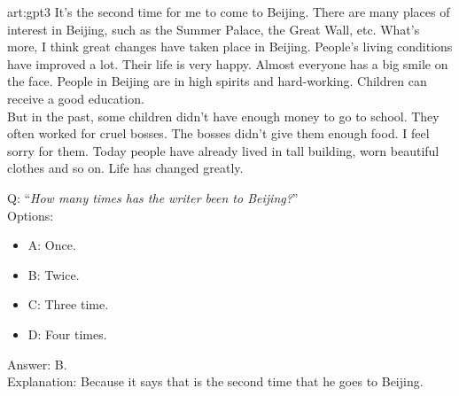 \begin{passage}{art:gpt3}
 It's the second time for me to come to Beijing. There are many places of interest in Beijing, such as the Summer Palace, the Great Wall, etc. What's more, I think great changes have taken place in Beijing. People's living conditions have improved a lot. Their life is very happy. Almost everyone has a big smile on the face. People in Beijing are in high spirits and hard-working. Children can receive a good education. \\
But in the past, some children didn't have enough money to go to school. They often worked for cruel bosses. The bosses didn't give them enough food. I feel sorry for them. Today people have already lived in tall building, worn beautiful clothes and so on. Life has changed greatly.
\end{passage}
Q: ``\emph{How many times has the writer been to Beijing?}''\\
Options: 
\begin{itemize}
 \item A: Once.
 \item B: Twice.
 \item C: Three time.
 \item D: Four times.
\end{itemize}
Answer: B. \\
Explanation: Because it says that is the second time that he goes to Beijing.

